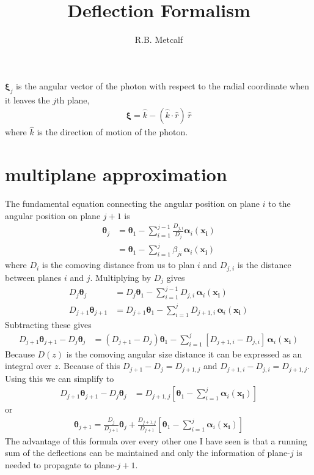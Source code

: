 \documentclass[12pt,a4paper]{article}
\title{Deflection Formalism}
\author{R.B. Metcalf}
\begin{document}
\maketitle

$\pmb{\xi}_j$ is the angular vector of the photon with respect to the radial coordinate when it leaves the $j$th plane,  
\begin{align}
\pmb{\xi} = \hat{k} - ( \hat{k}\cdot \hat{r}  )\, \hat{r}
\end{align}
where $\hat{k}$ is the direction of motion of the photon.
\section{multiplane approximation}

The fundamental equation connecting the angular position on plane $i$ to the angular position on plane $j+1$ is
\begin{align}
\pmb{\theta}_{j} 
&= \pmb{\theta}_1 - \sum_{i=1}^{j-1} \frac{D_{j,i}}{D_{j}}  \pmb{\alpha}_i(\pmb{x_i}) \\
&= \pmb{\theta}_1 - \sum_{i=1}^{j} \beta_{ji} \, \pmb{\alpha}_i(\pmb{x_i})
\end{align}
where $D_i$ is the comoving distance from us to plan $i$ and $D_{j,i}$ is the distance between planes $i$ and $j$.
Multiplying by $D_{j}$ gives
\begin{align}
D_j \pmb{\theta}_{j} 
&= D_j \pmb{\theta}_1 - \sum_{i=1}^{j-1} D_{j,i} \,  \pmb{\alpha}_i(\pmb{x_i}) \\
D_{j+1} \pmb{\theta}_{j+1} 
&= D_{j+1} \pmb{\theta}_1 - \sum_{i=1}^{j} D_{j+1,i} \,  \pmb{\alpha}_i(\pmb{x_i}) 
\end{align}
Subtracting these gives
\begin{align}
D_{j+1} \pmb{\theta}_{j+1} - D_j \pmb{\theta}_{j} 
&= \left( D_{j+1} - D_j \right) \pmb{\theta}_1 - \sum_{i=1}^{j} \left[ D_{j+1,i} - D_{j,i}  \right] \,  \pmb{\alpha}_i(\pmb{x_i}) 
\end{align}
Because $D(z)$ is the comoving angular size distance it can be expressed as an integral over $z$.  Because of this $D_{j+1} - D_j = D_{j+1,j}$ and $ D_{j+1,i} - D_{j,i} = D_{j+1,j}$.  Using this we can simplify to
\begin{align}
D_{j+1} \pmb{\theta}_{j+1} - D_j \pmb{\theta}_{j} 
&= D_{j+1,j} \left[ \pmb{\theta}_1 - \sum_{i=1}^{j}  \pmb{\alpha}_i(\pmb{x_i}) \right]
\end{align}
or
\begin{align}
\pmb{\theta}_{j+1} = \frac{D_j}{D_{j+1}} \pmb{\theta}_{j} 
+ \frac{D_{j+1,j}}{D_{j+1}} \left[ \pmb{\theta}_1 - \sum_{i=1}^{j}  \pmb{\alpha}_i(\pmb{x_i}) \right]
\end{align}
The advantage of this formula over every other one I have seen is that a running sum of the deflections can be maintained and only the information of plane-$j$ is needed to propagate to plane-$j+1$.
\end{document}

